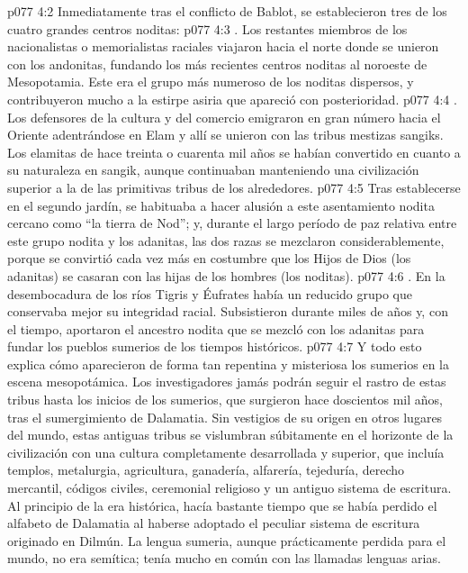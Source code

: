 \vs p077 4:2 Inmediatamente tras el conflicto de Bablot, se establecieron tres de los cuatro grandes centros noditas:
\vs p077 4:3 . Los restantes miembros de los nacionalistas o memorialistas raciales viajaron hacia el norte donde se unieron con los andonitas, fundando los más recientes centros noditas al noroeste de Mesopotamia. Este era el grupo más numeroso de los noditas dispersos, y contribuyeron mucho a la estirpe asiria que apareció con posterioridad.
\vs p077 4:4 . Los defensores de la cultura y del comercio emigraron en gran número hacia el Oriente adentrándose en Elam y allí se unieron con las tribus mestizas sangiks. Los elamitas de hace treinta o cuarenta mil años se habían convertido en cuanto a su naturaleza en sangik, aunque continuaban manteniendo una civilización superior a la de las primitivas tribus de los alrededores.
\vs p077 4:5 Tras establecerse en el segundo jardín, se habituaba a hacer alusión a este asentamiento nodita cercano como “la tierra de Nod”; y, durante el largo período de paz relativa entre este grupo nodita y los adanitas, las dos razas se mezclaron considerablemente, porque se convirtió cada vez más en costumbre que los Hijos de Dios (los adanitas) se casaran con las hijas de los hombres (los noditas).
\vs p077 4:6 . En la desembocadura de los ríos Tigris y Éufrates había un reducido grupo que conservaba mejor su integridad racial. Subsistieron durante miles de años y, con el tiempo, aportaron el ancestro nodita que se mezcló con los adanitas para fundar los pueblos sumerios de los tiempos históricos.
\vs p077 4:7 Y todo esto explica cómo aparecieron de forma tan repentina y misteriosa los sumerios en la escena mesopotámica. Los investigadores jamás podrán seguir el rastro de estas tribus hasta los inicios de los sumerios, que surgieron hace doscientos mil años, tras el sumergimiento de Dalamatia. Sin vestigios de su origen en otros lugares del mundo, estas antiguas tribus se vislumbran súbitamente en el horizonte de la civilización con una cultura completamente desarrollada y superior, que incluía templos, metalurgia, agricultura, ganadería, alfarería, tejeduría, derecho mercantil, códigos civiles, ceremonial religioso y un antiguo sistema de escritura. Al principio de la era histórica, hacía bastante tiempo que se había perdido el alfabeto de Dalamatia al haberse adoptado el peculiar sistema de escritura originado en Dilmún. La lengua sumeria, aunque prácticamente perdida para el mundo, no era semítica; tenía mucho en común con las llamadas lenguas arias.
